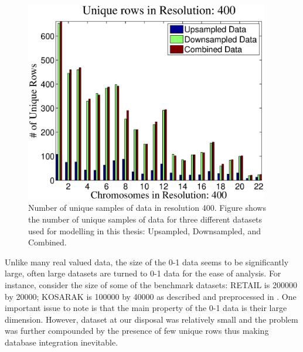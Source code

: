 \begin{figure}[h!]
\centering
\includegraphics[width=0.95\textwidth]{figures/numunqrows400}
\caption[Number of unique samples of data in resolution 400]{Number of unique samples of data in resolution 400. Figure shows the number of unique samples of data for three different datasets used for modelling in this thesis: Upsampled, Downsampled, and Combined.}\label{Fig:ratioschr}
\end{figure}

Unlike many real valued data, the size of the \mbox{0-1} data seems to be significantly large, often large datasets are turned to \mbox{0-1} data for the ease of analysis. For instance, consider the size of some of the benchmark datasets: RETAIL \cite{retail} is 200000 by 20000; KOSARAK is 100000 by 40000 as described and preprocessed in \cite{randomization}. One important issue to note is that the main property of the \mbox{0-1} data is their large dimension. However, dataset at our disposal was relatively small and the problem was further compounded by the presence of few unique rows thus making database integration inevitable.

